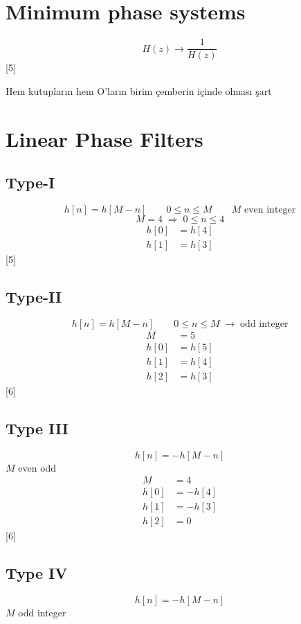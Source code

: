 \documentclass[11pt,a4paper]{article}
\begin{document}
\section{Minimum phase systems}
\[ H(z) \longrightarrow \frac{1}{H(z)} \]
[5]

Hem kutupların hem O'ların birim çemberin içinde olması şart

\section{Linear Phase Filters}
\subsection{Type-I}
\[ h[n] = h[M-n] \qquad 0 \le n \le M \qquad M \text{ even integer} \]
\[ M = 4 \;\Rightarrow\; 0 \le n \le 4 \]
\begin{align*}
h[0] &= h[4]\\
h[1] &= h[3]
\end{align*}
[5]

\subsection{Type-II}
\[ h[n] = h[M-n] \qquad 0 \le n \le M \;\rightarrow\; \text{odd integer} \]
\begin{align*}
M &= 5\\
h[0] &= h[5]\\
h[1] &= h[4]\\
h[2] &= h[3]
\end{align*}
[6]

\subsection{Type III}
\[ h[n] = -h[M-n] \]
$M$ even odd
\begin{align*}
M &= 4\\
h[0] &= -h[4]\\
h[1] &= -h[3]\\
h[2] &= 0
\end{align*}
[6]

\subsection{Type IV}
\[ h[n] = -h[M-n] \]
$M$ odd integer
\end{document}
